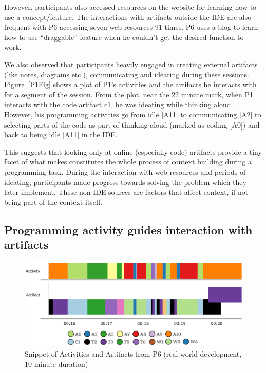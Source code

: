 However, participants also accessed resources on the website for learning how to use a concept/feature. The interactions with artifacts outside the IDE are also frequent with P6 accessing seven web resources 91 times. P6 uses a blog to learn how to use ``draggable'' feature when he couldn't get the desired function to work.

We also observed that participants heavily engaged in creating external artifacts (like notes, diagrams etc.), communicating and ideating during these sessions. Figure~\ref{P1Fig} shows a plot of P1's activities and the artifacts he interacts with for a segment of the session. From the plot, near the 22 minute mark, when P1 interacts with the code artifact c1, he was ideating while thinking aloud. However, his programming activities go from idle [A11] to communicating [A2] to selecting parts of the code as part of thinking aloud (marked as coding [A0]) and back to being idle [A11] in the IDE. 

This suggests that looking only at online (especially code) artifacts provide a tiny facet of what makes constitutes the whole process of context building during a programming task. During the interaction with web resources and periods of ideating, participants made progress towards solving the problem which they later implement. These non-IDE sources are factors that affect context, if not being part of the context itself.

\subsection{Programming activity guides interaction with artifacts}

\begin{figure}
\includegraphics[width=2.08\columnwidth]{figures/P6timeplot}
\caption{Snippet of Activities and Artifacts from P6 (real-world development, 10-minute duration)}
\label{P6Fig}
\end{figure}

